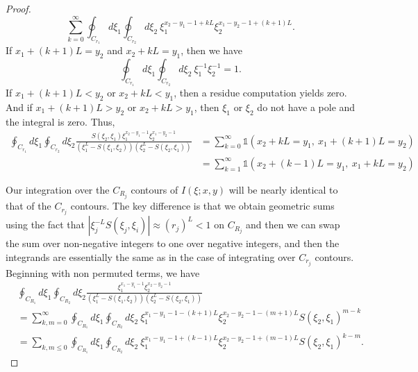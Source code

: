 \documentclass[10pt,a4paper]{amsart}
\begin{document}
\begin{proof}
\begin{equation}
    \sum_{k=0}^\infty\oint_{C_{r_1}}d\xi_1\oint_{C_{r_2}}d\xi_2\ \xi_1^{x_2-y_1-1+kL}\xi_2^{x_1-y_2-1+(k+1)L}.
\end{equation}
If $x_1 + (k+1)L=y_2$ and $x_2+kL=y_1$, then we have 
\begin{equation}
    \oint_{C_{r_1}}d\xi_1\oint_{C_{r_2}}d\xi_2 \ \xi_1^{-1}\xi_2^{-1} = 1.
\end{equation}
If $x_1 + (k+1)L<y_2$ or $x_2+kL<y_1$, then a residue computation yields zero. And if $x_1 + (k+1)L>y_2$ or $x_2+kL>y_1$, then $\xi_1$ or $\xi_2$ do not have a pole and the integral is zero. Thus, 
\begin{equation}
\begin{split}
    \oint_{C_{r_1}}d\xi_1\oint_{C_{r_2}}d\xi_2 \frac{S(\xi_2,\xi_1)\xi_1^{x_2-y_1-1}\xi_2^{x_1-y_2-1}}{\left(\xi_1^L - S(\xi_1,\xi_2) \right)\left(\xi_2^L - S(\xi_2,\xi_1) \right)}&=\sum_{k=0}^\infty\mathds{1}\left(x_2+kL=y_1,\ x_1+(k+1)L=y_2 \right)\\
    &=\sum_{k=1}^\infty\mathds{1}\left(x_2+(k-1)L=y_1,\ x_1+kL=y_2 \right)
    \end{split}
\end{equation}

Our integration over the $C_{R_j}$ contours of $I(\xi;x,y)$ will be nearly identical to that of the $C_{r_j}$ contours. The key difference is that we obtain geometric sums using the fact that $|\xi_j^{-L} S(\xi_j,\xi_i)|\approx (r_j)^L <1$ on $C_{R_j}$ and then we can swap the sum over non-negative integers to one over negative integers, and then the integrands are essentially the same as in the case of integrating over $C_{r_j}$ contours. Beginning with non permuted terms, we have
\begin{equation}
    \begin{split}
        &\oint_{C_{R_1}}d\xi_1\oint_{C_{R_2}}d\xi_2 \frac{\xi_1^{x_1-y_1-1}\xi_2^{x_2-y_2-1}}{\left(\xi_1^L - S(\xi_1,\xi_2) \right)\left(\xi_2^L - S(\xi_2,\xi_1) \right)} \\ 
        &=\sum_{k,m=0}^\infty \oint_{C_{R_1}}d\xi_1\oint_{C_{R_2}}d\xi_2 \ \xi_1^{x_1-y_1-1-(k+1)L}\xi_2^{x_2-y_2-1-(m+1)L}S(\xi_2,\xi_1)^{m-k} \\ 
        &= \sum_{k,m\leq0} \oint_{C_{R_1}}d\xi_1\oint_{C_{R_2}}d\xi_2 \ \xi_1^{x_1-y_1-1+(k-1)L}\xi_2^{x_2-y_2-1+(m-1)L}S(\xi_2,\xi_1)^{k-m}.
    \end{split}
\end{equation}


\end{proof}
\end{document}
